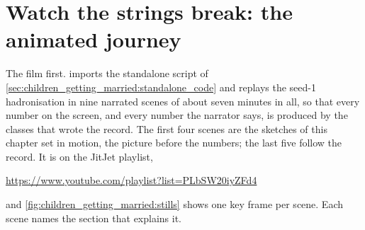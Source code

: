 \section{Watch the strings break: the animated journey}
\label{sec:children_getting_married:animation}

The film first. 
imports the standalone script of \cref{sec:children_getting_married:standalone_code}
and replays the seed-1 hadronisation in nine narrated scenes of about seven
minutes in all, so that every number on the screen, and every number the
narrator says, is produced by the classes that wrote the record. The first
four scenes are the sketches of
this chapter set in motion, the picture before the numbers; the last five
follow the record. It is on the JitJet playlist,
\begin{center}
  \url{https://www.youtube.com/playlist?list=PLbSW20iyZFd4}
\end{center}
and \cref{fig:children_getting_married:stills} shows one key frame per
scene. Each scene names the section that explains it.
